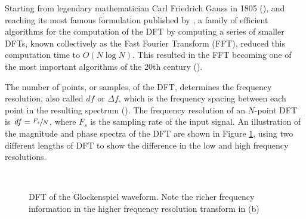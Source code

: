 \documentclass[report.tex]{subfiles}
\begin{document}
Starting from legendary mathematician Carl Friedrich Gauss in 1805 (\cite{gausshist}), and reaching its most famous formulation published by \textcite{cooleytukey}, a family of efficient algorithms for the computation of the DFT by computing a series of smaller DFTs, known collectively as the Fast Fourier Transform (FFT), reduced this computation time to $O(N \log{N})$. This resulted in the FFT becoming one of the most important algorithms of the 20th century (\cite{ffttopten}).

The number of points, or samples, of the DFT, determines the frequency resolution, also called $\mathit{df}$ or $\mathit{\Delta f}$, which is the frequency spacing between each point in the resulting spectrum (\cite{discretebook}). The frequency resolution of an $N$-point DFT is $\mathit{df} = \sfrac{F_{s}}{N}$, where $F_{s}$ is the sampling rate of the input signal. An illustration of the magnitude and phase spectra of the DFT are shown in Figure \ref{fig:glockdft}, using two different lengths of DFT to show the difference in the low and high frequency resolutions.

\begin{figure}[ht]
	\centering
	\\
	\caption{DFT of the Glockenspiel waveform. Note the richer frequency information in the higher frequency resolution transform in (b)}
	\label{fig:glockdft}
\end{figure}
\end{document}
